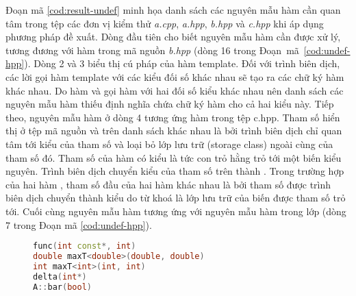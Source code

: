 Đoạn mã \ref{cod:result-undef} minh họa danh sách các nguyên mẫu hàm cần quan tâm trong tệp các đơn vị kiểm thử \textit{a.cpp}, \textit{a.hpp}, \textit{b.hpp} và \textit{c.hpp} khi áp dụng phương pháp đề xuất. Dòng đầu tiên cho biết nguyên mẫu hàm  cần được xử lý, tương đương với hàm  trong mã nguồn \textit{b.hpp} (dòng 16 trong Đoạn~mã~\ref{cod:undef-hpp}). Dòng 2 và 3 biểu thị cú pháp của hàm template. Đối với trình biên dịch, các lời gọi hàm template với các kiểu đối số khác nhau sẽ tạo ra các chữ ký hàm khác nhau. Do hàm  và  gọi hàm  với hai đối số kiểu khác nhau nên danh sách các nguyên mẫu hàm thiếu định nghĩa chứa chữ ký hàm cho cả hai kiểu này. Tiếp theo, nguyên mẫu hàm ở dòng 4 tương ứng hàm  trong tệp c.hpp. Tham số hiển thị ở tệp mã nguồn và trên danh sách khác nhau là bởi trình biên dịch chỉ quan tâm tới kiểu của tham số và loại bỏ lớp lưu trữ (storage class) ngoài cùng của tham số đó. Tham số  của hàm  có kiểu là  tức con trỏ hằng trỏ tới một biến kiểu nguyên. Trình biên dịch chuyển kiểu của tham số trên thành . Trong trường hợp của hai hàm , tham số đầu của hai hàm khác nhau là bởi tham số  được trình biên dịch chuyển thành kiểu  do từ khoá  là lớp lưu trữ của biến được tham số trỏ tới. Cuối cùng nguyên mẫu hàm  tương ứng với nguyên mẫu hàm  trong lớp  (dòng 7 trong Đoạn mã \ref{cod:undef-hpp}).
\begin{figure}[t]
\begin{lstlisting}[language=C++, caption={Danh sách các nguyên mẫu hàm thiếu định nghĩa tìm bởi trình biên dịch.}, label={cod:result-undef}, captionpos=b]
func(int const*, int)
double maxT<double>(double, double)        
int maxT<int>(int, int)     
delta(int*)
A::bar(bool)         
\end{lstlisting}
\end{figure}
